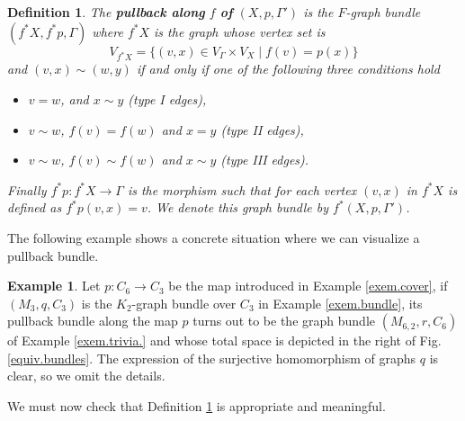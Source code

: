 \documentclass{amsart}
\newtheorem{defn}[theo]{Definition}
\theoremstyle{definition}
\newtheorem{example}[theo]{Example}
\numberwithin{equation}{section}
\begin{document}
\begin{defn}\label{pullback}
The \textbf{pullback along } $f$ \textbf{of } $(X, p, \Gamma')$ is the $F$-graph bundle $(f^*X, f^*p, \Gamma)$ where $f^*X$ is the graph whose vertex set is 
\begin{equation*}
    V_{f^* X} = \{(v, x) \in V_{\Gamma} \times V_{X} \mid f(v) = p(x)\}
\end{equation*}
and $(v,x) \sim (w, y)$ if and only if one of the following three conditions hold
\begin{itemize}
    \item[\rm (1).] $v = w$, and $x\sim y$ (type I edges),
    \item[\rm (2).] $v\sim w$, $f(v) = f(w)$ and $x = y$ (type II edges),
    \item[\rm (3).] $v\sim w$, $f(v) \sim f(w)$ and $x \sim y$ (type III edges).
\end{itemize}
Finally $f^*p: f^*X \longrightarrow \Gamma$ is the morphism such that for each vertex $(v,x)$ in $f^*X$ is defined as $f^*p(v,x) = v$. We denote this graph bundle by $f^*(X, p, \Gamma')$.
\end{defn}

The following example shows a concrete situation where we can visualize a pullback bundle.

\begin{example}
Let $p: C_6 \longrightarrow C_3$ be the map introduced in Example \ref{exem.cover}, if $(M_3, q, C_3)$ is the $K_2$-graph bundle over $C_3$ in Example \ref{exem.bundle}, its pullback bundle along the map $p$ turns out to be the graph bundle $(M_{6,2}, r, C_6)$ of Example \ref{exem.trivia.} and whose total space is depicted in the right of Fig. \ref{equiv.bundles}. The  expression of the surjective homomorphism of graphs $q$ is clear, so we omit the details.
\end{example}

We must now check that Definition \ref{pullback} is appropriate and meaningful.
\end{document}

